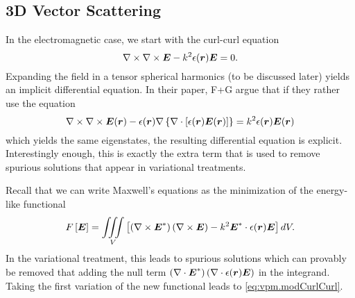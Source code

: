 \subsection{3D Vector Scattering}
In the electromagnetic case, we start with the curl-curl equation
  \begin{equation}
    \nabla\times\nabla\times\boldsymbol{E}-k^2\epsilon(\boldsymbol{r})\boldsymbol{E}=0.
  \end{equation}
Expanding the field in a tensor spherical harmonics (to be discussed later) yields
an implicit differential equation. In their paper, F+G argue that if they rather
use the equation
  \begin{equation}
   \label{eq:vpm.modCurlCurl}
   \nabla\times\nabla\times\boldsymbol{E}(\boldsymbol{r})-\epsilon(\boldsymbol{r})\nabla\left\{\nabla\cdot\left[\epsilon(\boldsymbol{r})\boldsymbol{E}(\boldsymbol{r})\right]\right\}
      =k^2\epsilon(\boldsymbol{r})\boldsymbol{E}(\boldsymbol{r})
  \end{equation}
which yields the same eigenstates, the resulting differential equation is explicit. 
Interestingly enough, this is exactly the extra term that is used to remove
spurious solutions that appear in variational treatments. 

Recall that we can write Maxwell's equations as the minimization of the energy-like functional
  \begin{equation}
   F\left[\boldsymbol{E}\right]=\mathop{\iiint}_V\left[\left(\nabla\times\boldsymbol{E}^*\right)\left(\nabla\times\boldsymbol{E}\right)-k^2\boldsymbol{E}^*\cdot\epsilon(\boldsymbol{r})\boldsymbol{E}\right]dV.
  \end{equation}
In the variational treatment, this leads to spurious solutions which can provably be removed \cite{KON1976,KOS1984,KOS1985} that adding the null term
$\left(\nabla\cdot\boldsymbol{E}^*\right)\left(\nabla\cdot\epsilon(\boldsymbol{r})\boldsymbol{E}\right)$ in the integrand. 
Taking the first variation of the new functional leads to \eqref{eq:vpm.modCurlCurl}.
  

